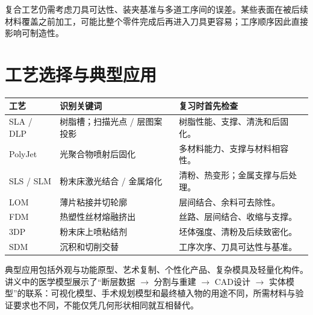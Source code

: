 复合工艺仍需考虑刀具可达性、装夹基准与多道工序间的误差。某些表面在被后续材料覆盖之前加工，可能比整个零件完成后再进入刀具更容易；工序顺序因此直接影响可制造性。

\section{工艺选择与典型应用}
\begin{table}[H]
\centering\small
\begin{tabularx}{\linewidth}{@{}p{2.2cm} X X@{}}
\toprule
工艺 & 识别关键词 & 复习时首先检查 \\
\midrule
SLA / DLP & 树脂槽；扫描光点 / 层图案投影 & 树脂性能、支撑、清洗和后固化。 \\
PolyJet & 光聚合物喷射后固化 & 多材料能力、支撑与材料相容性。 \\
SLS / SLM & 粉末床激光结合 / 金属熔化 & 清粉、热变形；金属支撑与后处理。 \\
LOM & 薄片粘接并切轮廓 & 层间结合、余料可去除性。 \\
FDM & 热塑性丝材熔融挤出 & 丝路、层间结合、收缩与支撑。 \\
3DP & 粉末床上喷粘结剂 & 坯体强度、清粉及后续致密化。 \\
SDM & 沉积和切削交替 & 工序次序、刀具可达性与基准。 \\
\bottomrule
\end{tabularx}
\end{table}


典型应用包括外观与功能原型、艺术复制、个性化产品、复杂模具及轻量化构件。讲义中的医学模型展示了“断层数据 $\to$ 分割与重建 $\to$ CAD设计 $\to$ 实体模型”的联系：可视化模型、手术规划模型和最终植入物的用途不同，所需材料与验证要求也不同，不能仅凭几何形状相同就互相替代。

\Needspace{11cm}

